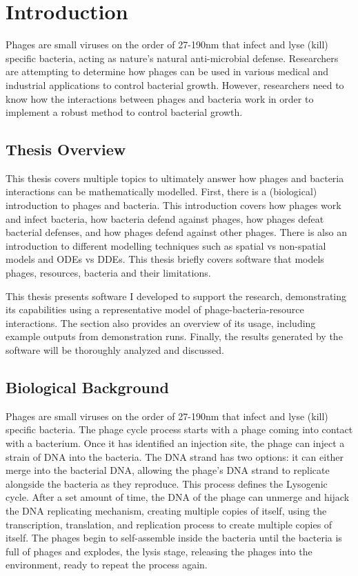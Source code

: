 \chapter{Introduction}
\label{Introduction}

Phages are small viruses on the order of 27-190nm that infect and lyse (kill) specific bacteria, acting as nature's natural anti-microbial defense. 
Researchers are attempting to determine how phages can be used in various medical and industrial applications to control bacterial growth. 
However, researchers need to know how the interactions between phages and bacteria work in order to implement a robust method to control bacterial growth. \newline 

\section{Thesis Overview}
This thesis covers multiple topics to ultimately answer how phages and bacteria interactions can be mathematically modelled. 
First, there is a (biological) introduction to phages and bacteria. 
This introduction covers how phages work and infect bacteria, how bacteria defend against phages, how phages defeat bacterial defenses, and how phages defend against other phages. 
There is also an introduction to different modelling techniques such as spatial vs non-spatial models and ODEs vs DDEs. 
This thesis briefly covers software that models phages, resources, bacteria and their limitations. 

This thesis presents software I developed to support the research, demonstrating its capabilities using a representative model of phage-bacteria-resource interactions. 
The section also provides an overview of its usage, including example outputs from demonstration runs.
Finally, the results generated by the software will be thoroughly analyzed and discussed.

\section{Biological Background}
Phages are small viruses on the order of 27-190nm that infect and lyse (kill) specific bacteria.
The phage cycle process starts with a phage coming into contact with a bacterium.
Once it has identified an injection site, the phage can inject a strain of DNA into the bacteria.
The DNA strand has two options: it can either merge into the bacterial DNA, allowing the phage's DNA strand to replicate alongside the bacteria as they reproduce.
This process defines the Lysogenic cycle.
After a set amount of time, the DNA of the phage can unmerge and hijack the DNA replicating mechanism, creating multiple copies of itself, using the transcription, translation, and replication process to create multiple copies of itself.
The phages begin to self-assemble inside the bacteria until the bacteria is full of phages and explodes, the lysis stage, releasing the phages into the environment, ready to repeat the process again. 

